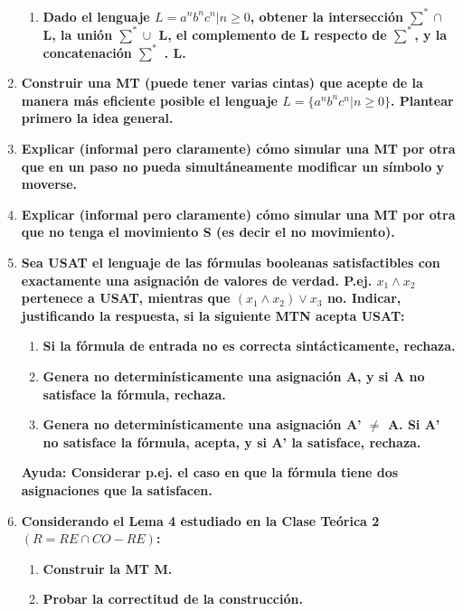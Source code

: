 \documentclass{article}
\begin{document}
\begin{enumerate}
\begin{enumerate}
\item \textbf{Dado el lenguaje $L = {a^n b^n c^n | n \geq 0}$, 
obtener la intersección 
$\sum^* \cap$ L, la unión $\sum^* \cup$ L, el
complemento de L respecto de $\sum^*$, 
y la concatenación $\sum^*$ . L.}

\end{enumerate}

\item \textbf{ Construir una MT (puede tener varias cintas) que acepte de la manera más eficiente
posible el lenguaje $L = \{a^n b^n c^n | n \geq 0\}$. Plantear primero la idea general.}

\item \textbf{Explicar (informal pero claramente) cómo simular una MT por otra que en un paso
no pueda simultáneamente modificar un símbolo y moverse.}

\item \textbf{Explicar (informal pero claramente) cómo simular una MT por otra que no tenga el
movimiento S (es decir el no movimiento).}

\item \textbf{Sea USAT el lenguaje de las fórmulas booleanas satisfactibles con exactamente una
asignación de valores de verdad. P.ej. $x_1 \wedge x_2$ pertenece a USAT, mientras que $(x_1 \wedge x_2) \vee x_3$ no.
Indicar, justificando la respuesta, si la siguiente MTN acepta USAT: }

\begin{enumerate}
\item \textbf{Si la fórmula de entrada no es correcta sintácticamente, rechaza.}
\item \textbf{ Genera no determinísticamente una asignación A, y si A no satisface la fórmula, rechaza.}
\item \textbf{Genera no determinísticamente una asignación A’ $\neq$ A. Si A’ no satisface la fórmula, acepta,
y si A’ la satisface, rechaza.}
\end{enumerate}

\textbf{Ayuda: Considerar p.ej. el caso en que la fórmula tiene dos asignaciones que la satisfacen.
}

\item \textbf{Considerando el Lema 4 estudiado en la Clase Teórica 2 $(R = RE \cap CO-RE)$:}

\begin{enumerate}
\item \textbf{ Construir la MT M.}
\item \textbf{Probar la correctitud de la construcción.} 
\end{enumerate}


\end{enumerate}
\end{document}
